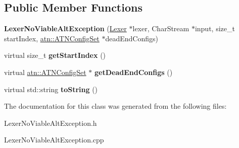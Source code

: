 \subsection*{Public Member Functions}
\begin{DoxyCompactItemize}
\item 
\mbox{\label{classantlr4_1_1LexerNoViableAltException_ae38dd353ce71950057fde6d4a599a230}} 
{\bfseries Lexer\+No\+Viable\+Alt\+Exception} (\hyperlink{classantlr4_1_1Lexer}{Lexer} $\ast$lexer, Char\+Stream $\ast$input, size\+\_\+t start\+Index, \hyperlink{classantlr4_1_1atn_1_1ATNConfigSet}{atn\+::\+A\+T\+N\+Config\+Set} $\ast$dead\+End\+Configs)
\item 
\mbox{\label{classantlr4_1_1LexerNoViableAltException_a22b4b362f9d4dc307e288f1606cf2e8d}} 
virtual size\+\_\+t {\bfseries get\+Start\+Index} ()
\item 
\mbox{\label{classantlr4_1_1LexerNoViableAltException_af86bf4a331d7051916693f21b6f50e99}} 
virtual \hyperlink{classantlr4_1_1atn_1_1ATNConfigSet}{atn\+::\+A\+T\+N\+Config\+Set} $\ast$ {\bfseries get\+Dead\+End\+Configs} ()
\item 
\mbox{\label{classantlr4_1_1LexerNoViableAltException_a06ce90cd1ab3b8dbccab4a0254886610}} 
virtual std\+::string {\bfseries to\+String} ()
\end{DoxyCompactItemize}


The documentation for this class was generated from the following files\+:\begin{DoxyCompactItemize}
\item 
Lexer\+No\+Viable\+Alt\+Exception.\+h\item 
Lexer\+No\+Viable\+Alt\+Exception.\+cpp\end{DoxyCompactItemize}
